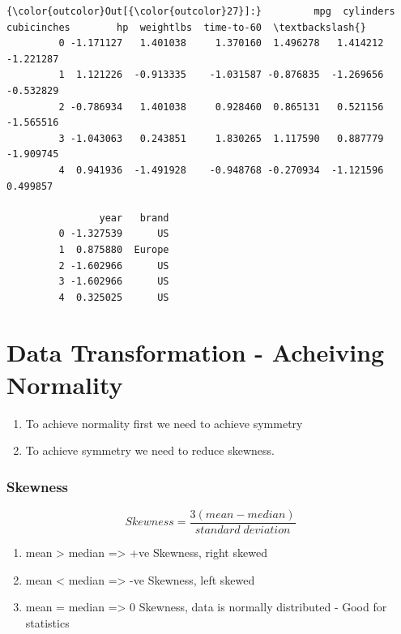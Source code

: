 \documentclass[11pt]{article}
\providecommand{\tightlist}{%
      \setlength{\itemsep}{0pt}\setlength{\parskip}{0pt}}
\begin{document}
\begin{Verbatim}[commandchars=\\\{\}]
{\color{outcolor}Out[{\color{outcolor}27}]:}         mpg  cylinders  cubicinches        hp  weightlbs  time-to-60  \textbackslash{}
         0 -1.171127   1.401038     1.370160  1.496278   1.414212   -1.221287   
         1  1.121226  -0.913335    -1.031587 -0.876835  -1.269656   -0.532829   
         2 -0.786934   1.401038     0.928460  0.865131   0.521156   -1.565516   
         3 -1.043063   0.243851     1.830265  1.117590   0.887779   -1.909745   
         4  0.941936  -1.491928    -0.948768 -0.270934  -1.121596    0.499857   
         
                year   brand  
         0 -1.327539      US  
         1  0.875880  Europe  
         2 -1.602966      US  
         3 -1.602966      US  
         4  0.325025      US  
\end{Verbatim}
            
    \section{Data Transformation - Acheiving
Normality}\label{data-transformation---acheiving-normality}

\begin{enumerate}
\def\labelenumi{\arabic{enumi}.}
\tightlist
\item
  To achieve normality first we need to achieve symmetry
\item
  To achieve symmetry we need to reduce skewness.
\end{enumerate}

    \subsubsection{Skewness}\label{skewness}

\[Skewness = \frac{3(mean-median)}{standard\;deviation}\]

\begin{enumerate}
\def\labelenumi{\arabic{enumi}.}
\tightlist
\item
  mean \textgreater{} median =\textgreater{} +ve Skewness, right skewed
\item
  mean \textless{} median =\textgreater{} -ve Skewness, left skewed
\item
  mean = median =\textgreater{} 0 Skewness, data is normally distributed
  - Good for statistics
\end{enumerate}
\end{document}
